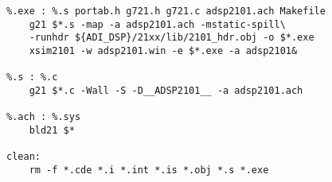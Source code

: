 \begin{verbatim}
%.exe : %.s portab.h g721.h g721.c adsp2101.ach Makefile
	g21 $*.s -map -a adsp2101.ach -mstatic-spill\
	-runhdr ${ADI_DSP}/21xx/lib/2101_hdr.obj -o $*.exe
	xsim2101 -w adsp2101.win -e $*.exe -a adsp2101&

%.s : %.c
	g21 $*.c -Wall -S -D__ADSP2101__ -a adsp2101.ach

%.ach : %.sys
	bld21 $*

clean:
	rm -f *.cde *.i *.int *.is *.obj *.s *.exe
\end{verbatim}